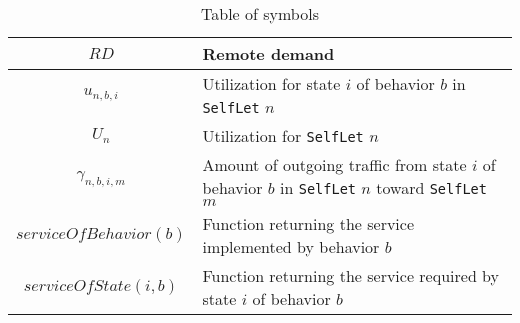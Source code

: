 \documentclass[11pt]{amsart}
\newcommand{\slet}{\texttt{SelfLet}}
\begin{document}
\begin{table}[htbp]
\begin{center}
\begin{tabular}{|c|p{12cm}|}
$RD$ & Remote demand \\ \hline
$u_{n,b,i}$ & Utilization for state $i$ of behavior $b$ in \slet{} $n$ \\ \hline
$U_n$ & Utilization for \slet{} $n$ \\ \hline
$\gamma_{n,b,i,m}$ & Amount of outgoing traffic from state $i$ of behavior $b$ in \slet{} $n$ toward \slet{} $m$ \\ \hline
$serviceOfBehavior(b)$ & Function returning the service implemented by behavior $b$ \\ \hline
$serviceOfState(i,b)$ & Function returning the service required by state $i$ of  behavior $b$\\ \hline

\end{tabular}
\end{center}
\caption{Table of symbols}

\end{table}
\end{document}
